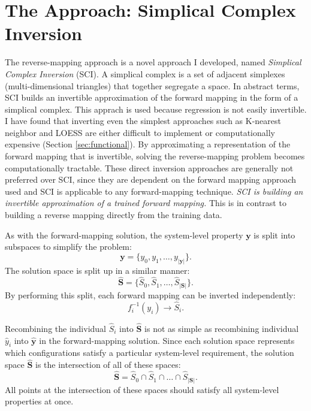 \section{The \fw Approach: Simplical Complex Inversion}
The \fw reverse-mapping approach is a novel approach I developed, named \textit{Simplical Complex Inversion} (SCI).
A simplical complex is a set of adjacent simplexes (multi-dimensional triangles) that together segregate a space.
In abstract terms, SCI builds an invertible approximation of the forward mapping in the form of a simplical complex.
This apprach is used because regression is not easily invertible.
I have found that inverting even the simplest approaches such as K-nearest neighbor and LOESS are either difficult to implement or computationally expensive (Section \ref{sec:functional}).
By approximating a representation of the forward mapping that is invertible, solving the reverse-mapping problem becomes computationally tractable.
These direct inversion approaches are generally not preferred over SCI, since they are dependent on the forward mapping approach used and SCI is applicable to any forward-mapping technique.
\textit{SCI is building an invertible approximation of a trained forward mapping.}
This is in contrast to building a reverse mapping directly from the training data.

As with the forward-mapping solution, the system-level property $\mathbf y$ is split into subspaces to simplify the problem:
\[ \mathbf y = \{y_0, y_1, \ldots, y_{|\mathbf y|}\}. \]
The solution space is split up in a similar manner:
\[ \hat{\mathbf S} = \{\hat S_0, \hat S_1, \ldots, \hat S_{|\mathbf S|}\}. \]
By performing this split, each forward mapping can be inverted independently:
\[ f^{-1}_i(y_i) \rightarrow \hat S_i. \]

Recombining the individual $\hat S_i$ into $\hat{\mathbf S}$ is not as simple as recombining individual $\hat y_i$ into $\hat{\mathbf y}$ in the forward-mapping solution.
Since each solution space represents which configurations satisfy a particular system-level requirement, the solution space $\hat{\mathbf S}$ is the intersection of all of these spaces:
\[ \hat{\mathbf S} = \hat S_0 \cap \hat S_1 \cap \ldots \cap \hat S_{|\mathbf S|}.\]
All points at the intersection of these spaces should satisfy all system-level properties at once.

